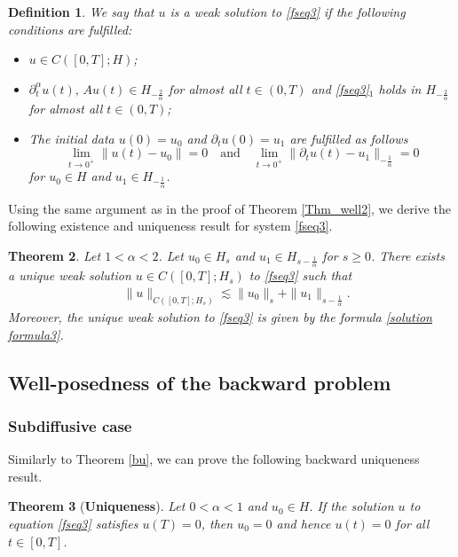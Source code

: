 \documentclass[reqno]{amsart}
\newtheorem{theorem}{Theorem}[section]
\newtheorem{defn}[theorem]{Definition}
\numberwithin{equation}{section}
\begin{document}
\begin{defn} \label{solution_def3}
	We say that $u$ is a weak solution to \eqref{fseq3} if the following conditions are fulfilled:
	\begin{itemize}
		\item[(i)] $u\in C([0,T];H)$;
		\item[(ii)] $\partial_t^\alpha u(t),\, Au(t)\in H_{-\frac{2}{\alpha}}$ for almost all $t\in (0,T)$ and \eqref{fseq3}$_{1}$ holds in $H_{-\frac{2}{\alpha}}$ for almost all $t\in (0,T)$;
		\item[(iii)] The initial data $u(0)=u_0$ and $\partial_t u(0)=u_1$ are fulfilled as follows
		$$\lim_{t\to 0^{+}}\|u(t)-u_0\|=0\quad\mbox{and}\quad \lim_{t\to 0^{+}}\|\partial_t u(t)-u_1\|_{-\frac{1}{\alpha}}=0$$
		for $u_0\in H$ and $u_1\in H_{-\frac{1}{\alpha}}$.
	\end{itemize}
\end{defn} 
Using the same argument as in the proof of Theorem \ref{Thm_well2}, we derive the following existence and uniqueness result for system \eqref{fseq3}.
\begin{theorem} \label{Thm_well3}
	Let $1<\alpha < 2$. Let $u_0\in H_s$ and $u_1\in H_{s-\frac{1}{\alpha}}$ for $s\geq 0$. There exists a unique weak solution $u \in C([0, T] ; H_s)$ to \eqref{fseq3} such that 
		\begin{align}
			&\|u\|_{C([0,T];H_s)}\lesssim \|u_0\|_s + \|u_1\|_{s-\frac{1}{\alpha}}.
		\end{align}
	Moreover, the unique weak solution to \eqref{fseq3} is given by the formula \eqref{solution formula3}.
\end{theorem}

\subsection{Well-posedness of the backward problem}
\subsubsection{Subdiffusive case}
Similarly to Theorem \ref{bu}, we can prove the following backward uniqueness result.
\begin{theorem}[\textbf{Uniqueness}]\label{bu2}
Let $0<\alpha < 1$ and $u_0 \in H$. If the solution $u$ to equation \eqref{fseq3} satisfies $u(T) = 0$, then $u_0 = 0$ and hence $u(t) = 0$ for all $t \in [0, T]$.
\end{theorem}
\end{document}

